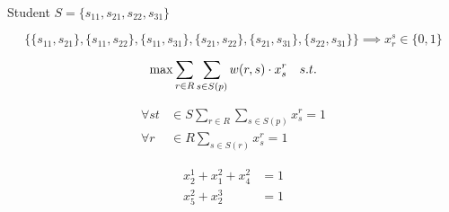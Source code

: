 \documentclass[12pt]{article}
\begin{document}
\\
Student $S=\{s_{11}, s_{21}, s_{22},s_{31}\}$




\begin{equation*}
\{\{s_{11}, s_{21}\}, \{s_{11},s_{22}\},\{s_{11},s_{31}\},  \{s_{21},s_{22}\}, \{s_{21},s_{31}\},  \{s_{22},s_{31}\} \}\implies x_r^s \in \{0, 1\}
\end{equation*}

\begin{equation*}
\max\sum_{r\in{R}}\sum_{s\in{S(p)}}w(r,s)\cdot{x_s^r}\quad{s.t.}\\
\end{equation*}

\begin{align*}
\forall{st}&\in{S}\sum_{r\in{R}}\sum_{s\in{S(p)}}x_s^r=1\\
\forall{r}&\in{R}\sum_{s\in{S(r)}}x_s^r=1
\end{align*}



\begin{align*}
x_2^1+x_1^2+x_4^2&=1\\
x_5^2+x_2^3&=1\\
\end{align*}

\end{document}
